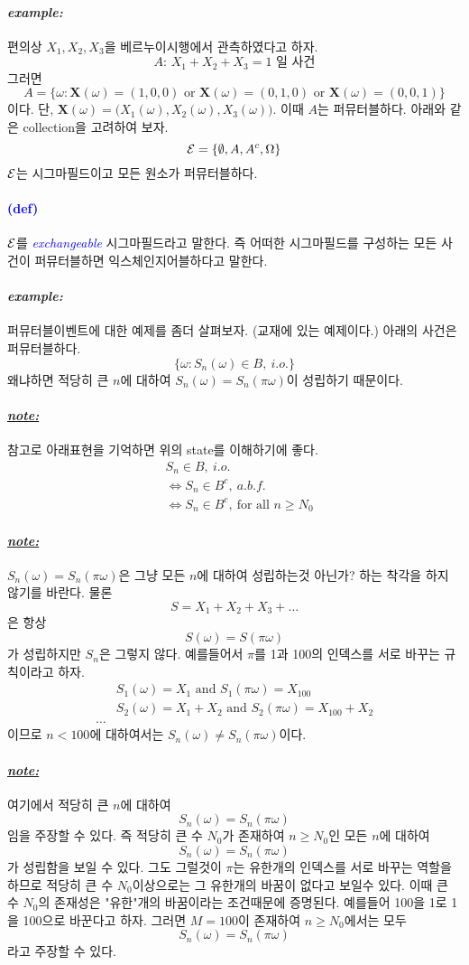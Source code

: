 \documentclass[12pt,oneside,english]{book}
\def\note{\paragraph{\Large\textit{\underline{note:}}}\Large}
\def\ex{\paragraph{\Large\textit{example:}}\Large}
\newcommand{\parablue}[1]{\paragraph{\Large\textcolor{blue}{(#1)}}\Large}
\newcommand{\bsX}{\mbox{$\boldsymbol{X}$}}
\begin{document}
\ex 편의상 $X_1,X_2,X_3$을 베르누이시행에서 관측하였다고 하자. 
\[
\mbox{$A$: $X_1+X_2+X_3=1$ 일 사건} 
\]
그러면 
\[
A=\{\omega: \bsX(\omega)=(1,0,0) \mbox{ or } \bsX(\omega)=(0,1,0) \mbox{ or } \bsX(\omega)=(0,0,1)\}
\]
이다. 단, $\bsX(\omega)=\big(X_1(\omega),X_2(\omega),X_3(\omega)\big)$. 이때 $A$는 퍼뮤터블하다. 아래와 같은 collection을 고려하여 보자. 
\[
{\cal E}=\{\emptyset,A,A^c,\Omega \}
\]
$\cal E$는 시그마필드이고 모든 원소가 퍼뮤터블하다. 

\parablue{def} ${\cal E}$를 \emph{\textcolor{blue}{exchangeable}} 시그마필드라고 말한다. 즉 어떠한 시그마필드를 구성하는 모든 사건이 퍼뮤터블하면 익스체인지어블하다고 말한다. 

\ex 퍼뮤터블이벤트에 대한 예제를 좀더 살펴보자. (교재에 있는 예제이다.) 아래의 사건은 퍼뮤터블하다. 
\[
\{\omega:S_n(\omega) \in B, ~i.o.\}
\]
왜냐하면 적당히 큰 $n$에 대하여 $S_n(\omega)=S_n(\pi\omega)$이 성립하기 때문이다. 

\note 참고로 아래표현을 기억하면 위의 state를 이해하기에 좋다. 
\begin{align*}
& S_n \in B, ~i.o. \\
& \Longleftrightarrow S_n \in B^c, ~ a.b.f. \\ 
& \Longleftrightarrow S_n \in B^c, ~ \mbox{for all } n\geq N_0
\end{align*}

\note $S_n(\omega)=S_n(\pi\omega)$은 그냥 모든 $n$에 대하여 성립하는것 아닌가? 하는 착각을 하지 않기를 바란다. 물론 
\[
S=X_1+X_2+X_3+\dots
\]
은 항상 
\[
S(\omega)=S(\pi\omega)
\]가 성립하지만 $S_n$은 그렇지 않다. 예를들어서 $\pi$를 1과 100의 인덱스를 서로 바꾸는 규칙이라고 하자. 
\begin{align*}
& S_1(\omega)=X_1 \mbox{ and } S_1(\pi\omega)=X_{100} \\& S_2(\omega)=X_1+X_2 \mbox{ and } S_2(\pi\omega)=X_{100}+X_2 \\
\dots
\end{align*}
이므로 $n< 100$에 대하여서는 $S_n(\omega)\neq S_n(\pi\omega)$이다. 

\note 여기에서 적당히 큰 $n$에 대하여 
\[
S_n(\omega)=S_n(\pi\omega)
\]
임을 주장할 수 있다. 즉 적당히 큰 수 $N_0$가 존재하여 $n\geq N_0$인 모든 $n$에 대하여 
\[
S_n(\omega)=S_n(\pi\omega)
\]
가 성립함을 보일 수 있다. 그도 그럴것이 $\pi$는 유한개의 인덱스를 서로 바꾸는 역할을 하므로 적당히 큰 수 $N_0$이상으로는 그 유한개의 바꿈이 없다고 보일수 있다. 이때 큰 수 $N_0$의 존재성은 "유한"개의 바꿈이라는 조건때문에 증명된다. 예를들어 100을 1로 1을 100으로 바꾼다고 하자. 그러면 $M=100$이 존재하여 $n \geq N_0$에서는 모두 
\[
S_n(\omega)=S_n(\pi\omega)
\]
라고 주장할 수 있다. 
\end{document}
